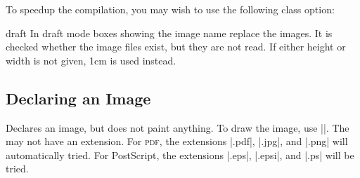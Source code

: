 To speedup the compilation, you may wish to use the following class option:
%
\begin{packageoption}{draft}
    In draft mode boxes showing the image name replace the images. It is
    checked whether the image files exist, but they are not read. If either
    height or width is not given, 1cm is used instead.
\end{packageoption}


\subsection{Declaring an Image}

\begin{command}{\pgfdeclareimage{}}
    Declares an image, but does not paint anything. To draw the image, use
    ||. The  may not have an
    extension. For \textsc{pdf}, the extensions |.pdf|, |.jpg|, and |.png|
    will automatically tried. For PostScript, the extensions |.eps|, |.epsi|,
    and |.ps| will be tried.


\end{command}
